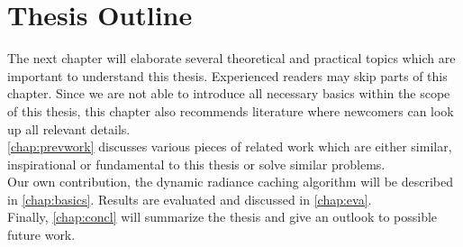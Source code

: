 \documentclass[thesis.tex]{subfiles}
\begin{document}
\section{Thesis Outline}
The next chapter will elaborate several theoretical and practical topics which are important to understand this thesis. %
Experienced readers may skip parts of this chapter.
Since we are not able to introduce all necessary basics within the scope of this thesis, this chapter also recommends literature where newcomers can look up all relevant details.
\\
\autoref{chap:prevwork} discusses various pieces of related work which are either similar, inspirational or fundamental to this thesis or solve similar problems.
\\
Our own contribution, the dynamic radiance caching algorithm will be described in \autoref{chap:basics}.
Results are evaluated and discussed in \autoref{chap:eva}.
\\
Finally, \autoref{chap:concl} will summarize the thesis and give an outlook to possible future work.

\subfilebib %
\end{document}
